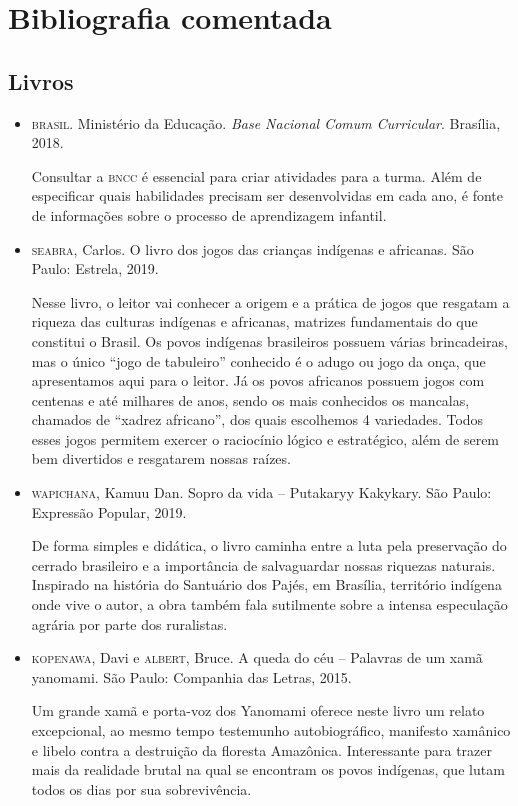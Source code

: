 \documentclass[11pt]{extarticle}
\begin{document}
\section{Bibliografia comentada}
\subsection{Livros}

\begin{itemize}
\item \textsc{brasil}. Ministério da Educação. \textit{Base Nacional Comum Curricular}. Brasília, 2018.

Consultar a \textsc{bncc} é essencial para criar atividades para a turma. Além de especificar quais habilidades precisam ser desenvolvidas em cada ano, é fonte de informações sobre o processo de aprendizagem infantil. 

\item \textsc{seabra}, Carlos. O livro dos jogos das crianças indígenas e africanas. São Paulo: Estrela, 2019.

Nesse livro, o leitor vai conhecer a origem e a prática de jogos que resgatam a riqueza das culturas indígenas e africanas, matrizes fundamentais do que constitui o Brasil. Os povos indígenas brasileiros possuem várias brincadeiras, mas o único “jogo de tabuleiro” conhecido é o adugo ou jogo da onça, que apresentamos aqui para o leitor. Já os povos africanos possuem jogos com centenas e até milhares de anos, sendo os mais conhecidos os mancalas, chamados de “xadrez africano”, dos quais escolhemos 4 variedades. Todos esses jogos permitem exercer o raciocínio lógico e estratégico, além de serem bem divertidos e resgatarem nossas raízes.
 
\item \textsc{wapichana}, Kamuu Dan. Sopro da vida – Putakaryy Kakykary. São Paulo: Expressão Popular, 2019.

De forma simples e didática, o livro caminha entre a luta pela preservação do cerrado brasileiro e a importância de salvaguardar nossas riquezas naturais. Inspirado na história do Santuário dos Pajés, em Brasília, território indígena onde vive o autor, a obra também fala sutilmente sobre a intensa especulação agrária por parte dos ruralistas.

\item \textsc{kopenawa}, Davi e \textsc{albert}, Bruce. A queda do céu -- Palavras de um xamã yanomami. São Paulo: Companhia das Letras, 2015.

Um grande xamã e porta-voz dos Yanomami oferece neste livro um relato excepcional, ao mesmo tempo testemunho autobiográfico, manifesto xamânico e libelo contra a destruição da floresta Amazônica. Interessante para trazer mais da realidade brutal na qual se encontram os povos indígenas, que lutam todos os dias por sua sobrevivência. 
\end{itemize}
\end{document}
